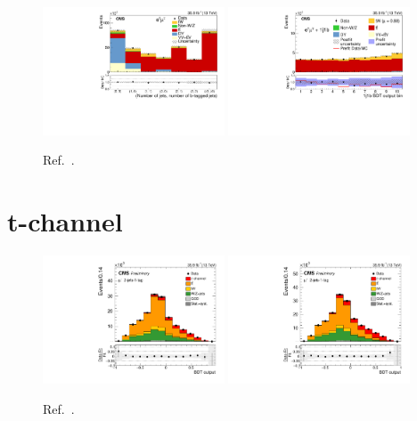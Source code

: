 \documentclass{PoS}
\begin{document}
\begin{figure}[!htb]
\begin{center}
\includegraphics[width=0.48\textwidth]{tw1.pdf}\hspace{0.02\textwidth}
\includegraphics[width=0.48\textwidth]{tw2.pdf}
\caption{\label{fig:tw-channel-bdt}Ref.~\cite{tWch}.}
\end{center}
\end{figure}

\section{t-channel}

\begin{figure}[!htb]
\begin{center}
\includegraphics[width=0.48\textwidth]{tch1.pdf}\hspace{0.02\textwidth}
\includegraphics[width=0.48\textwidth]{tch2.pdf}
\caption{\label{fig:t-channel-bdt}Ref.~\cite{tch}.}
\end{center}
\end{figure}
\end{document}
